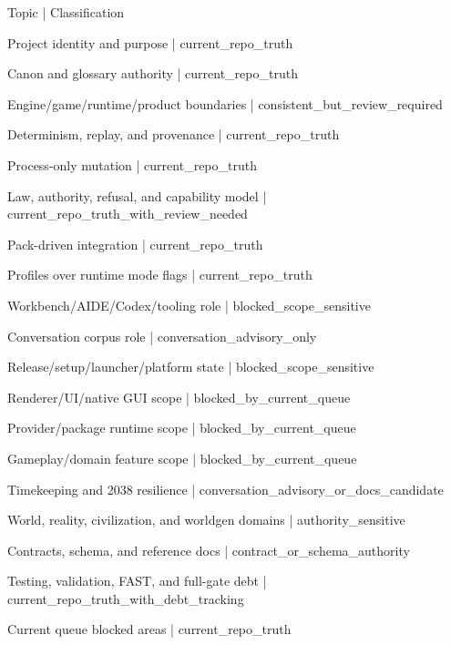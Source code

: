 \documentclass[11pt,a4paper]{report}
\begin{document}
{\small\ttfamily\raggedright Topic | Classification\par}
{\small\ttfamily\raggedright Project identity and purpose | current\_repo\_truth\par}
{\small\ttfamily\raggedright Canon and glossary authority | current\_repo\_truth\par}
{\small\ttfamily\raggedright Engine/\allowbreak{}game/\allowbreak{}runtime/\allowbreak{}product boundaries | consistent\_but\_review\_required\par}
{\small\ttfamily\raggedright Determinism, replay, and provenance | current\_repo\_truth\par}
{\small\ttfamily\raggedright Process-\allowbreak{}only mutation | current\_repo\_truth\par}
{\small\ttfamily\raggedright Law, authority, refusal, and capability model | current\_repo\_truth\_with\_review\_needed\par}
{\small\ttfamily\raggedright Pack-\allowbreak{}driven integration | current\_repo\_truth\par}
{\small\ttfamily\raggedright Profiles over runtime mode flags | current\_repo\_truth\par}
{\small\ttfamily\raggedright Workbench/\allowbreak{}AIDE/\allowbreak{}Codex/\allowbreak{}tooling role | blocked\_scope\_sensitive\par}
{\small\ttfamily\raggedright Conversation corpus role | conversation\_advisory\_only\par}
{\small\ttfamily\raggedright Release/\allowbreak{}setup/\allowbreak{}launcher/\allowbreak{}platform state | blocked\_scope\_sensitive\par}
{\small\ttfamily\raggedright Renderer/\allowbreak{}UI/\allowbreak{}native GUI scope | blocked\_by\_current\_queue\par}
{\small\ttfamily\raggedright Provider/\allowbreak{}package runtime scope | blocked\_by\_current\_queue\par}
{\small\ttfamily\raggedright Gameplay/\allowbreak{}domain feature scope | blocked\_by\_current\_queue\par}
{\small\ttfamily\raggedright Timekeeping and 2038 resilience | conversation\_advisory\_or\_docs\_candidate\par}
{\small\ttfamily\raggedright World, reality, civilization, and worldgen domains | authority\_sensitive\par}
{\small\ttfamily\raggedright Contracts, schema, and reference docs | contract\_or\_schema\_authority\par}
{\small\ttfamily\raggedright Testing, validation, FAST, and full-\allowbreak{}gate debt | current\_repo\_truth\_with\_debt\_tracking\par}
{\small\ttfamily\raggedright Current queue blocked areas | current\_repo\_truth\par}
\end{document}
